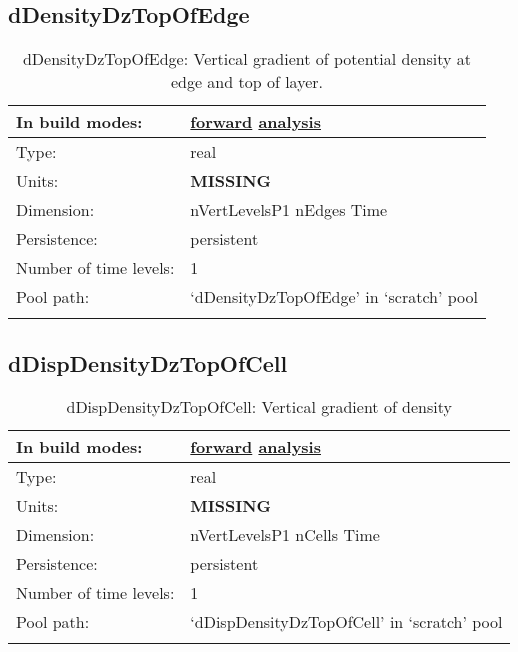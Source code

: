 \subsection[dDensityDzTopOfEdge]{dDensityDzTopOfEdge}
\label{subsec:var_sec_scratch_dDensityDzTopOfEdge}
\begin{center}
\begin{longtable}{| p{2.0in} | p{4.0in} |}
        \hline 
        In build modes: & \hyperref[subsec:forward_var_tab_scratch]{forward} \hyperref[subsec:analysis_var_tab_scratch]{analysis} \\
        \hline 
        Type: & real \\
        \hline 
        Units: & {\bf \color{red} MISSING} \\
        \hline 
        Dimension: & nVertLevelsP1 nEdges Time \\
        \hline 
        Persistence: & persistent \\
        \hline 
        Number of time levels: & 1 \\
        \hline 
            Pool path: & `dDensityDzTopOfEdge' in `scratch' pool \\
		 \hline 
    \caption{dDensityDzTopOfEdge: Vertical gradient of potential density at edge and top of layer.}
\end{longtable}
\end{center}
\subsection[dDispDensityDzTopOfCell]{dDispDensityDzTopOfCell}
\label{subsec:var_sec_scratch_dDispDensityDzTopOfCell}
\begin{center}
\begin{longtable}{| p{2.0in} | p{4.0in} |}
        \hline 
        In build modes: & \hyperref[subsec:forward_var_tab_scratch]{forward} \hyperref[subsec:analysis_var_tab_scratch]{analysis} \\
        \hline 
        Type: & real \\
        \hline 
        Units: & {\bf \color{red} MISSING} \\
        \hline 
        Dimension: & nVertLevelsP1 nCells Time \\
        \hline 
        Persistence: & persistent \\
        \hline 
        Number of time levels: & 1 \\
        \hline 
            Pool path: & `dDispDensityDzTopOfCell' in `scratch' pool \\
		 \hline 
    \caption{dDispDensityDzTopOfCell: Vertical gradient of density}
\end{longtable}
\end{center}
